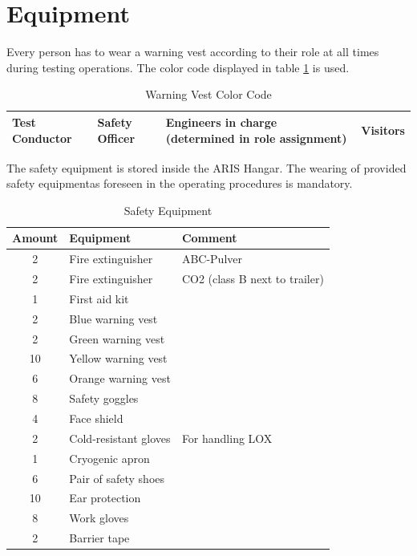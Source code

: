 \documentclass{article}
\begin{document}
\newpage
\section{Equipment}
Every person has to wear a warning vest according to their role at all times during testing operations. The color code displayed in table \ref{tab:color-code} is used.
\begin{table}[h]
    \caption{Warning Vest Color Code}
    \label{tab:color-code}
    \begin{tabularx}{0.9\textwidth}{|X|X|X|X|}
        \hline
        \cellcolor{cyan} Test Conductor & \cellcolor{green} Safety Officer & \cellcolor{orange} Engineers in charge (determined in role assignment) & \cellcolor{yellow} Visitors \\ \hline
    \end{tabularx}
\end{table}
The safety equipment is stored inside the ARIS Hangar. The wearing of provided safety equipmentas foreseen in the operating procedures is mandatory.
\begin{table}[h]
    \caption{Safety Equipment}
    \label{tab:safety-equipment}
    \begin{tabularx}{0.9\textwidth}{|c|X|X|}
        \hline
        \rowcolor{tableHeaderColor} \textbf{Amount} & \textbf{Equipment} & \textbf{Comment} \\ \hline
        2 & Fire extinguisher & ABC-Pulver \\ \hline
        2 & Fire extinguisher & CO2 (class B next to trailer) \\ \hline
        1 & First aid kit &  \\ \hline
        2 & Blue warning vest & \\ \hline
        2 & Green warning vest & \\ \hline
        10 & Yellow warning vest & \\ \hline
        6 & Orange warning vest & \\ \hline
        8 & Safety goggles & \\ \hline
        4 & Face shield & \\ \hline
        2 & Cold-resistant gloves & For handling LOX \\ \hline
        1 & Cryogenic apron & \\ \hline
        6 & Pair of safety shoes & \\ \hline
        10 & Ear protection & \\ \hline
        8 & Work gloves & \\ \hline
        2 & Barrier tape & \\ \hline
    \end{tabularx}
\end{table}
\end{document}
